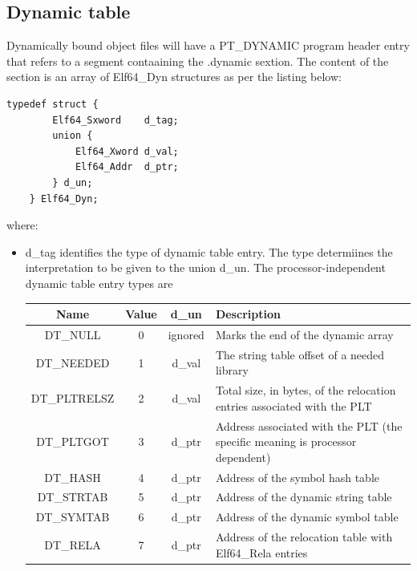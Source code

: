 \documentclass[paper=a4, fontsize=11pt]{report} %
\numberwithin{equation}{section} %
\numberwithin{figure}{section} %
\numberwithin{table}{section} %
\begin{document}
\subsection{Dynamic table}
Dynamically bound object files will have a {\ttfamily PT\_DYNAMIC} program 
header entry that refers to a segment contaaining the {\ttfamily .dynamic} 
sextion. The content of the section is an array of {\ttfamily Elf64\_Dyn} 
structures as per the listing below:
\begin{lstlisting}[style=ansic, caption={Dynamic Table Structure},
label=elf64dyn]
	typedef struct {
        Elf64_Sxword    d_tag;
        union {
            Elf64_Xword d_val;
            Elf64_Addr  d_ptr;
        } d_un;
	} Elf64_Dyn;
\end{lstlisting}
where:
\begin{itemize}
	\item {\ttfamily d\_tag} identifies the type of dynamic table entry. The 
	type determiines the interpretation to be given to the union {\ttfamily 
	d\_un}. The processor-independent dynamic table entry types are
\begin{table}[!htbp]\begin{center}\begin{tabular}{|c|c|c|p{10cm}|}
\hline
\textbf{Name} & \textbf{Value} & \textbf{d\_un} & \textbf{Description}\\ \hline
{\ttfamily DT\_NULL} & 0 & ignored & Marks the end of the dynamic array\\
\hline
{\ttfamily DT\_NEEDED} & 1 & {\ttfamily d\_val} & The string table offset of a 
needed library\\ \hline
{\ttfamily DT\_PLTRELSZ} & 2 & {\ttfamily d\_val} & Total size, in bytes, of 
the relocation entries associated with the PLT\\ \hline
{\ttfamily DT\_PLTGOT} & 3 & {\ttfamily d\_ptr} & Address associated with the 
PLT (the specific meaning is processor dependent)\\ \hline
{\ttfamily DT\_HASH} & 4 & {\ttfamily d\_ptr} & Address of the symbol hash 
table\\ \hline
{\ttfamily DT\_STRTAB} & 5 & {\ttfamily d\_ptr} & Address of the dynamic string 
table\\ \hline
{\ttfamily DT\_SYMTAB} & 6 & {\ttfamily d\_ptr} & Address of the dynamic symbol 
table\\ \hline
{\ttfamily DT\_RELA} & 7 & {\ttfamily d\_ptr} & Address of the relocation table 
with {\ttfamily Elf64\_Rela} entries\\ \hline

\end{tabular}
\end{center}
\end{table}
\end{itemize}
\end{document}
